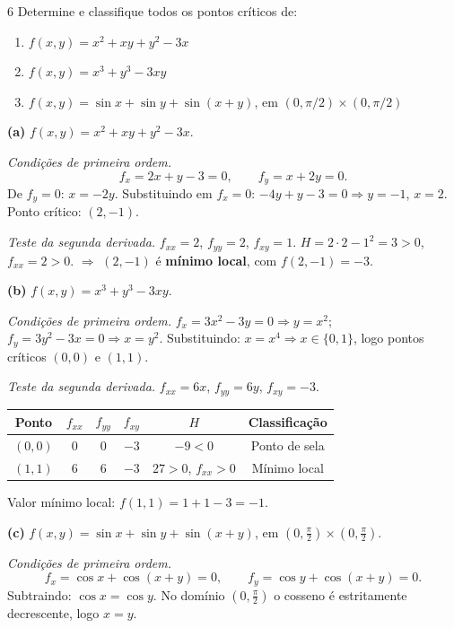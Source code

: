 \begin{exercisebox}{6}
  Determine e classifique todos os pontos críticos de:
  \begin{enumerate}[label=(\alph*)]
    \item $f(x,y) = x^2 + xy + y^2 - 3x$
    \item $f(x,y) = x^3 + y^3 - 3xy$
    \item $f(x,y) = \sin x + \sin y + \sin(x+y)$, em
          $(0,\pi/2)\times(0,\pi/2)$
  \end{enumerate}
\end{exercisebox}
\begin{solbox}
  \textbf{(a)} $f(x,y) = x^2+xy+y^2-3x$.

  \emph{Condições de primeira ordem.}
  \[
    f_x = 2x+y-3=0,\qquad f_y = x+2y=0.
  \]
  De $f_y=0$: $x=-2y$. Substituindo em $f_x=0$: $-4y+y-3=0\Rightarrow y=-1$,
  $x=2$. \quad Ponto crítico: $(2,-1)$.

  \emph{Teste da segunda derivada.}
  $f_{xx}=2$, $f_{yy}=2$, $f_{xy}=1$.
  $H = 2\cdot 2 - 1^2 = 3 > 0$, $f_{xx}=2>0$.
  $\Rightarrow$ $(2,-1)$ é \textbf{mínimo local}, com $f(2,-1)=-3$.

  \bigskip
  \textbf{(b)} $f(x,y)=x^3+y^3-3xy$.

  \emph{Condições de primeira ordem.}
  $f_x = 3x^2-3y=0 \Rightarrow y=x^2$; $f_y = 3y^2-3x=0 \Rightarrow x=y^2$.
  Substituindo: $x=x^4\Rightarrow x\in\{0,1\}$,
  logo pontos críticos $(0,0)$ e $(1,1)$.

  \emph{Teste da segunda derivada.}
  $f_{xx}=6x$, $f_{yy}=6y$, $f_{xy}=-3$.

  \begin{center}
  \renewcommand{\arraystretch}{1.3}
  \begin{tabular}{cccccc}
    \toprule
    Ponto & $f_{xx}$ & $f_{yy}$ & $f_{xy}$ & $H$ & Classificação \\
    \midrule
    $(0,0)$ & $0$ & $0$ & $-3$ & $-9<0$ & Ponto de sela \\
    $(1,1)$ & $6$ & $6$ & $-3$ & $27>0$, $f_{xx}>0$ & Mínimo local \\
    \bottomrule
  \end{tabular}
  \end{center}

  Valor mínimo local: $f(1,1)=1+1-3=-1$.

  \bigskip
  \textbf{(c)} $f(x,y)=\sin x+\sin y+\sin(x+y)$, em $(0,\tfrac{\pi}{2})\times(0,\tfrac{\pi}{2})$.

  \emph{Condições de primeira ordem.}
  \[
    f_x = \cos x + \cos(x+y) = 0,\qquad
    f_y = \cos y + \cos(x+y) = 0.
  \]
  Subtraindo: $\cos x = \cos y$. No domínio $(0,\tfrac{\pi}{2})$ o cosseno é estritamente
  decrescente, logo $x=y$.


\end{solbox}
